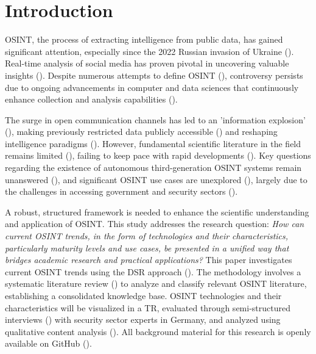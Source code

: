 \documentclass[10pt]{article}
\begin{document}
\section{Introduction} \label{sec:introduction}

OSINT, the process of extracting intelligence from public data, has gained significant attention, especially since the 2022 Russian invasion of Ukraine (\cite{DosPassos.2017}). Real-time analysis of social media has proven pivotal in uncovering valuable insights (\cite{SmithBoyle.24.07.2023}). Despite numerous attempts to define OSINT (\cite{PastorGalindo.2020, Yogish.2021}), controversy persists due to ongoing advancements in computer and data sciences that continuously enhance collection and analysis capabilities (\cite{Ghioni.2023}).

The surge in open communication channels has led to an 'information explosion' (\cite{Hwang.2022}), making previously restricted data publicly accessible (\cite{Williams.2018}) and reshaping intelligence paradigms (\cite{Dokman.2020}). However, fundamental scientific literature in the field remains limited (\cite{HerreraCubides.2020}), failing to keep pace with rapid developments (\cite{Ghioni.2023, Williams.2018}). Key questions regarding the existence of autonomous third-generation OSINT systems remain unanswered (\cite{Ghioni.2023, PastorGalindo.2020}), and significant OSINT use cases are unexplored (\cite{AlKilani.2021, Ghioni.2023}), largely due to the challenges in accessing government and security sectors (\cite{HerreraCubides.2020, PastorGalindo.2019}).

A robust, structured framework is needed to enhance the scientific understanding and application of OSINT. This study addresses the research question: \textit{How can current OSINT trends, in the form of technologies and their characteristics, particularly maturity levels and use cases, be presented in a unified way that bridges academic research and practical applications?} This paper investigates current OSINT trends using the DSR approach (\cite{Peffers.2007}). The methodology involves a systematic literature review (\cite{Cleven.2009}) to analyze and classify relevant OSINT literature, establishing a consolidated knowledge base. OSINT technologies and their characteristics will be visualized in a TR, evaluated through semi-structured interviews (\cite{Glaser.2009}) with security sector experts in Germany, and analyzed using qualitative content analysis (\cite{Billings.1997}). All background material for this research is openly available on GitHub (\cite{kayser2024}).
\end{document}
